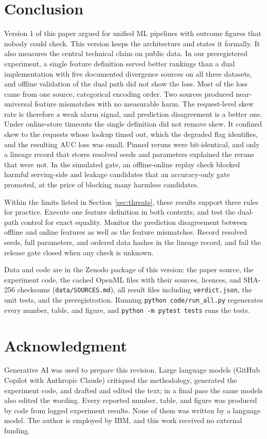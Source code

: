 \documentclass[journal]{IEEEtran}
\begin{document}
\section{Conclusion}
\label{sec:conclusion}

Version 1 of this paper argued for unified ML pipelines with outcome figures that nobody could check. This version keeps the architecture and states it formally. It also measures the central technical claim on public data. In our preregistered experiment, a single feature definition served better rankings than a dual implementation with five documented divergence sources on all three datasets, and offline validation of the dual path did not show the loss. Most of the loss came from one source, categorical encoding order. Two sources produced near-universal feature mismatches with no measurable harm. The request-level skew rate is therefore a weak alarm signal, and prediction disagreement is a better one. Under online-store timeouts the single definition did not remove skew. It confined skew to the requests whose lookup timed out, which the degraded flag identifies, and the resulting AUC loss was small. Pinned reruns were bit-identical, and only a lineage record that stores resolved seeds and parameters explained the reruns that were not. In the simulated gate, an offline-online replay check blocked harmful serving-side and leakage candidates that an accuracy-only gate promoted, at the price of blocking many harmless candidates.

Within the limits listed in Section~\ref{sec:threats}, these results support three rules for practice. Execute one feature definition in both contexts, and test the dual-path control for exact equality. Monitor the prediction disagreement between offline and online features as well as the feature mismatches. Record resolved seeds, full parameters, and ordered data hashes in the lineage record, and fail the release gate closed when any check is unknown.

Data and code are in the Zenodo package of this version: the paper source, the experiment code, the cached OpenML files with their sources, licences, and SHA-256 checksums (\texttt{data/SOURCES.md}), all result files including \texttt{verdict.json}, the unit tests, and the preregistration. Running \texttt{python code/run\_all.py} regenerates every number, table, and figure, and \texttt{python -m pytest tests} runs the tests.

\section*{Acknowledgment}
Generative AI was used to prepare this revision. Large language models (GitHub Copilot with Anthropic Claude) critiqued the methodology, generated the experiment code, and drafted and edited the text; in a final pass the same models also edited the wording. Every reported number, table, and figure was produced by code from logged experiment results. None of them was written by a language model. The author is employed by IBM, and this work received no external funding.



\end{document}
